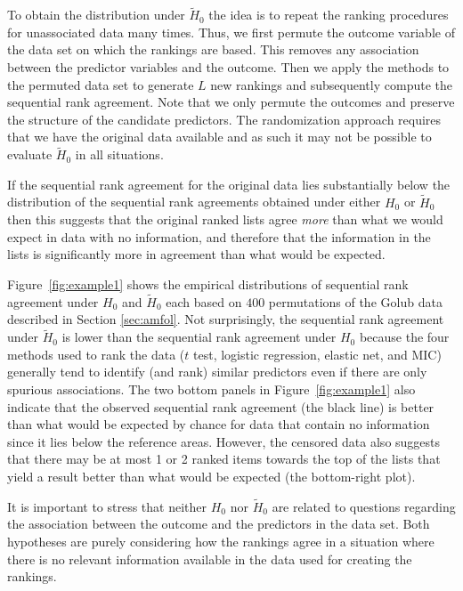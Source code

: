 \documentclass[12pt,a4paper]{article}
\theoremstyle{plain}
\begin{document}
To obtain the distribution under $\widetilde H_0$ the idea is to
repeat the ranking procedures for unassociated data many times.  Thus,
we first permute the outcome variable of the data set on which the
rankings are based. This removes any association between the predictor
variables and the outcome. Then we apply the methods to the permuted
data set to generate $L$ new rankings and subsequently compute the
sequential rank agreement. Note that we only permute the outcomes and
preserve the structure of the candidate predictors. The randomization
approach requires that we have the original data available and as such
it may not be possible to evaluate $\widetilde H_0$ in all situations.

If the sequential rank agreement for the original data lies
substantially below the distribution of the sequential rank agreements
obtained under either $H_0$ or $\widetilde H_0$ then this suggests that
the original ranked lists agree \emph{more} than what we would expect
in data with no information, and therefore that the information in the
lists is significantly more in agreement than what would be expected.

Figure~\ref{fig:example1} shows the empirical distributions of
sequential rank agreement under $H_0$ and $\widetilde H_0$ each based
on $400$ permutations of the Golub data described in Section
\ref{sec:amfol}. Not surprisingly, the sequential rank agreement under
$\widetilde H_0$ is lower than the sequential rank agreement under
$H_0$ because the four methods used to rank the data ($t$ test,
logistic regression, elastic net, and MIC) generally tend to identify
(and rank) similar predictors even if there are only spurious
associations. The two bottom panels in Figure~\ref{fig:example1} also
indicate that the observed sequential rank agreement (the black line)
is better than what would be expected by chance for data that contain
no information since it lies below the reference areas. However, the
censored data also suggests that there may be at most 1 or 2 ranked
items towards the top of the lists that yield a result better than
what would be expected (the bottom-right plot).

It is important to stress that neither $H_0$ nor $\widetilde H_0$ are
related to questions regarding the association between the outcome and
the predictors in the data set. Both hypotheses are purely considering
how the rankings agree in a situation where there is no relevant
information available in the data used for creating the rankings.
\end{document}
